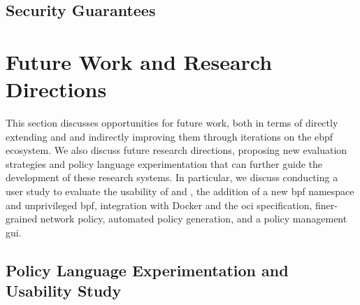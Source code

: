 \subsection{Security Guarantees}






\section{Future Work and Research Directions}%
\label{s:disc-future-work}

This section discusses opportunities for future work, both in terms of directly extending
\bpfbox{} and \bpfcontain{} and indirectly improving them through iterations on the
\gls{ebpf} ecosystem. We also discuss future research directions, proposing new evaluation
strategies and policy language experimentation that can further guide the development of
these research systems. In particular, we discuss conducting a user study to evaluate the
usability of \bpfbox{} and \bpfcontain{}, the addition of a new \gls{bpf} namespace and
unprivileged \gls{bpf}, integration with Docker and the \gls{oci} specification,
finer-grained network policy, automated policy generation, and a policy management \gls{gui}.


\subsection{Policy Language Experimentation and Usability Study}

